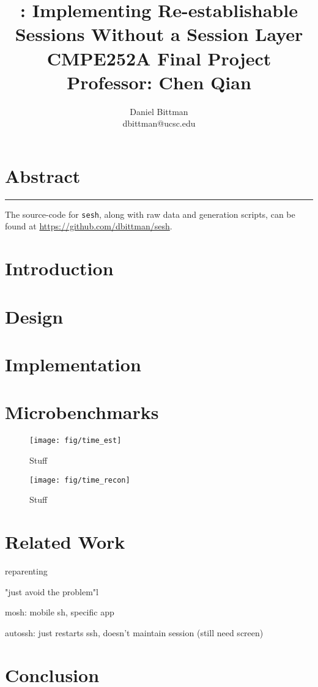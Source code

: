 \documentclass[twocolumn,10pt]{article}
\author{Daniel Bittman \\ dbittman@ucsc.edu}
\title{\sesh: \textbf{Implementing Re-establishable\\Sessions Without a Session Layer}
\\
{\vspace{5mm}\normalsize CMPE252A Final Project\\\vspace{-3mm} Professor: Chen Qian}
}
\newcommand{\sesh}{\texttt{sesh}\xspace}
\begin{document}
\biolinum
\maketitle
\libertine
\renewcommand\ttdefault{lmtt}

\section*{Abstract}


\begin{center}\noindent\rule{2cm}{0.4pt}\end{center}

The source-code for \sesh, along with raw data and generation scripts,
can be found at \url{https://github.com/dbittman/sesh}.

\section{Introduction}





\section{Design}



\section{Implementation}



\section{Microbenchmarks}


\begin{figure}
	\centering
	\texttt{[image: fig/time\_est]}
	\caption{Stuff}
	\label{fig:est}
\end{figure}

\begin{figure}
	\centering
	\texttt{[image: fig/time\_recon]}
	\caption{Stuff}
	\label{fig:est}
\end{figure}




\section{Related Work}

reparenting

"just avoid the problem"l


mosh: mobile sh, specific app

autossh: just restarts ssh, doesn't maintain session (still need screen)


\section{Conclusion}















\end{document}
